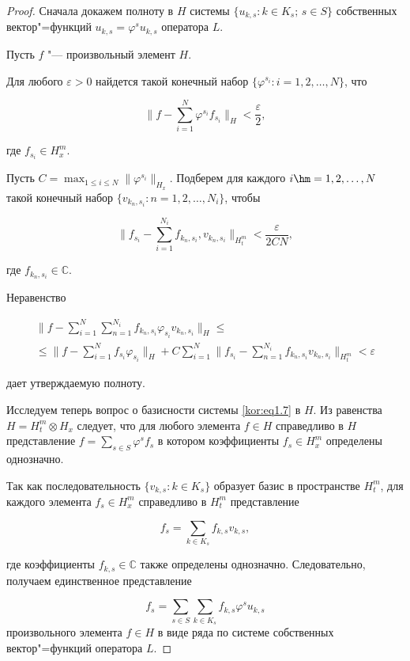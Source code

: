 \smallskip



\begin{proof} Сначала докажем полноту в $H$ системы $\{u_{k,s}: {k\in K_s};\,s\in S\}$ собственных вектор"=функций $u_{k,s}=\varphi^su_{k,s}$ оператора $L$. 

Пусть $f$ "--- произвольный элемент $H$. 

Для любого $\varepsilon>0$ найдется такой конечный набор $\{\varphi^{s_i}:i=1,2,\dots,N\}$, что

$$

\biggl\|f-\sum\limits_{i=1}^N{\varphi^{s_i}f_{s_i}}\biggr\|_H<\frac{\varepsilon}{2},

$$

где $f_{s_i} \in H_x^m $. 

Пусть $C=\max _{1\le i\le N}\|\varphi^{s_i}\|_{H_x}$. Подберем для каждого $i\hm =1,2,\dots,N$ такой конечный набор $\{v_{k_n,s_i}:n=1,2,\dots,N_i\}$, чтобы

$$

\biggl\|f_{s_i}-\sum\limits_{i=1}^{N_i}{f_{k_n,s_i},v_{k_n,s_i}}\biggr\|_{H_t^m}<\frac{\varepsilon}{2CN},

$$

где $f_{k_n,s_i}\in\mathbb{C}$. 

Неравенство 

\begin{multline}

\biggl\|f-\sum\limits_{i=1}^N{\sum\limits_{n=1}^{N_i}{f_{k_n,s_i}\varphi_{s_i}v_{k_n,s_i}}}\biggr\|_H

\le \\

\le 

\biggl\|f-\sum\limits_{i=1}^N{f_{s_i}\varphi_{s_i}}\biggr\|_H 

+

C\sum\limits_{i=1}^N \biggl\|f_{s_i}-\sum\limits_{n=1}^{N_i}{f_{k_n,s_i}v_{k_n,s_i}}\biggr\|_{H_t^m}<\varepsilon 

\end{multline}

дает утверждаемую полноту.



Исследуем теперь вопрос о базисности системы \eqref{kor:eq1.7} в $H$. Из равенства $H=H_t^m\otimes H_x$ следует, что для любого элемента $f\in H$ справедливо в $H$ представление $f=\sum _{s\in S}{\varphi^sf_s}$ в котором коэффициенты $f_s\in H_x^m$ определены однозначно. 

Так как последовательность $\{v_{k,s}:k\in K_s\}$ образует базис в пространстве $H_t^m$, для каждого элемента $f_s\in H_x^m$ справедливо в $H_t^m$ представление 

$$f_s=\sum\limits_{k\in K_s}{f_{k,s}v_{k,s}},$$ 

где коэффициенты $f_{k,s}\in\mathbb{C}$ также определены однозначно. Следовательно, получаем единственное представление 

$$f_s=\sum\limits_{s\in S}{\sum\limits_{k\in K_s}{f_{k,s}\varphi^su_{k,s}}}$$ произвольного элемента $f\in H$ в виде ряда по системе собственных вектор"=функций оператора $L$. \end{proof}




